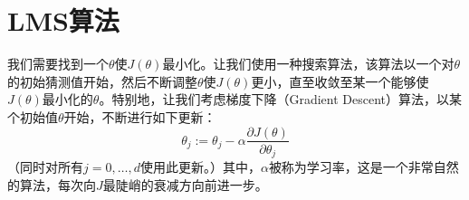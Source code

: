 \section{LMS算法}

我们需要找到一个$\theta$使$J(\theta)$最小化。让我们使用一种搜索算法，该算法以一个对$\theta$的初始猜测值开始，然后不断调整$\theta$使$J(\theta)$更小，直至收敛至某一个能够使$J(\theta)$最小化的$\theta$。特别地，让我们考虑梯度下降（Gradient Descent）算法，以某个初始值$\theta$开始，不断进行如下更新：
$$
  \theta_j:=\theta_j-\alpha\frac{\partial J(\theta)}{\partial \theta_j}
$$
（同时对所有$j=0,\ldots,d$使用此更新。）其中，$\alpha$被称为学习率，这是一个非常自然的算法，每次向$J$最陡峭的衰减方向前进一步。
